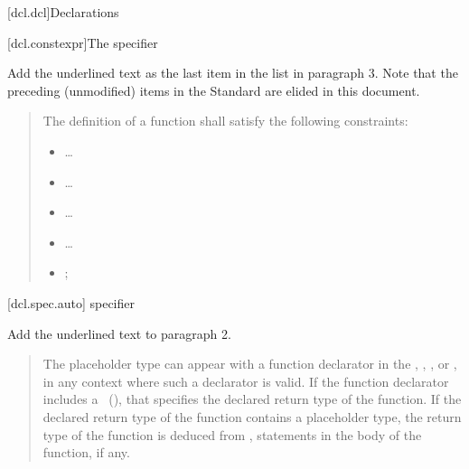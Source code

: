 
\setcounter{chapter}{6}
[dcl.dcl]{Declarations}

\setcounter{section}{1}
\setcounter{subsection}{4}
[dcl.constexpr]{The  specifier}%

Add the underlined text as the last item in the list in paragraph 3. Note that
the preceding (unmodified) items in the \Cpp Standard are elided in this
document.

\begin{quote}
  \setcounter{Paras}{2}
\pnum
{}
The definition of a  function shall satisfy the following
constraints:

\begin{itemize}
  \item \ldots
  \item \ldots
  \item \ldots
  \item \ldots
  \item {};
\end{itemize}
\end{quote}

%
%  
%      

\setcounter{section}{1}
\setcounter{subsection}{6}
\setcounter{subsubsection}{3}
[dcl.spec.auto]{ specifier}

Add the underlined text to paragraph 2.

\begin{quote}
\setcounter{Paras}{1}
\pnum
The placeholder type can appear with a function declarator in the
, ,
, or ,
in any context where such a declarator is valid. If the function declarator
includes a ~(), that specifies
the declared return type of the function. If the declared return type of the
function contains a placeholder type, the return type of the function is
deduced from , statements in the body of the function, if any.
\end{quote}

